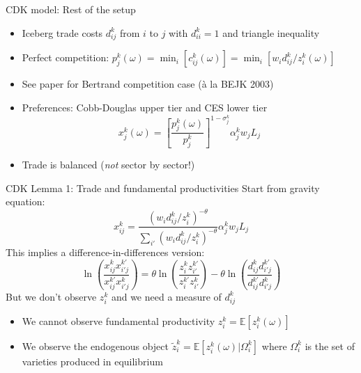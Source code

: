 \documentclass[10pt,notes=hide]{beamer}
\begin{document}
\begin{frame}{CDK model: Rest of the setup}
\begin{itemize}
	\item Iceberg trade costs $d_{ij}^k$ from $i$ to $j$ with $d_{ii}^k=1$ and triangle inequality
	\item Perfect competition: $p_{j}^k(\omega) = \min_i \left[c_{ij}^k(\omega)\right] = \min_i \left[w_i d_{ij}^k/z_i^k(\omega)\right] $
	\item See paper for Bertrand competition case (\`{a} la BEJK 2003)
	\item Preferences: Cobb-Douglas upper tier and CES lower tier
	\begin{equation*}
	x_j^k(\omega) = \left[\frac{p_j^k(\omega)}{p_j^k} \right]^{1-\sigma_j^k} \alpha_j^k w_j L_j
	\end{equation*}
	\item Trade is balanced (\textit{not} sector by sector!)
\end{itemize}
\end{frame}
\begin{frame}{CDK Lemma 1: Trade and fundamental productivities}
Start from gravity equation:
\begin{equation*}
	x_{ij}^{k}
	= \frac{  \left(w_i d_{ij}^k/z_i^k\right)^{-\theta}}
	{\sum_{i'}\left(w_i d_{ij}^k/z_i^k\right)^{-\theta}} 
	\alpha_j^k w_j L_j
\end{equation*}
This implies a difference-in-differences version:
\begin{equation*}
\ln \left(\frac{x_{ij}^{k}x_{i'j}^{k'}}{x_{ij}^{k'}x_{i'j}^{k}}\right)
=
\theta \ln \left(\frac{z_{i}^{k}z_{i'}^{k'}}{z_{i}^{k'}z_{i'}^{k}}\right)
-
\theta \ln \left(\frac{d_{ij}^{k}d_{i'j}^{k'}}{d_{ij}^{k'}d_{i'j}^{k}}\right)
\end{equation*}
But we don't observe $z_{i}^k$ and we need a measure of $d_{ij}^k$
\begin{itemize}
	\item We cannot observe fundamental productivity
	$z_{i}^k = \mathbb{E}\left[z_i^k(\omega)\right]$
	\item We observe the endogenous object
	$\tilde{z}_{i}^k = \mathbb{E}\left[z_i^k(\omega) \vert \Omega_{i}^k\right]$
	where $\Omega_{i}^k$ is the set of varieties produced in equilibrium
\end{itemize}
\end{frame}
\end{document}
